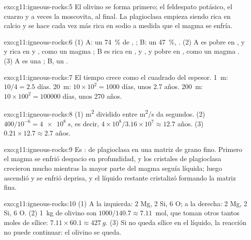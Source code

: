 \begin{solution}{exo:g11:igneous-rocks:5}
El olivino se forma primero; el feldespato potásico, el cuarzo y a veces la
moscovita, al final. La plagioclasa empieza siendo rica en calcio y se hace
cada vez más rica en sodio a medida que el magma se enfría.
\end{solution}

\begin{solution}{exo:g11:igneous-rocks:6}
(1) A: un \qty{74}{\percent} de , ; B: un \qty{47}{\percent},
. (2) A es pobre en ,  y  y rica en  y
, como un magma ; B es rica en ,  y , y
pobre en , como un magma . (3) A es una ; B, un .
\end{solution}

\begin{solution}{exo:g11:igneous-rocks:7}
El tiempo crece como el cuadrado del espesor. \qty{1}{m}: $10/4 = 2.5$
días. \qty{20}{m}: $10 \times 10^2 = 1000$ días, unos 2.7 años.
\qty{200}{m}: $10 \times 100^2 = \num{100000}$ días, unos 270 años.
\end{solution}

\begin{solution}{exo:g11:igneous-rocks:8}
(1) \unit{m^2} dividido entre \unit{m^2/s} da segundos. (2) $400/10^{-6} =
\qty{4e8}{s}$, es decir, $4 \times 10^8 / 3.16 \times 10^7 \approx 12.7$
años. (3) $0.21 \times 12.7 \approx 2.7$ años.
\end{solution}

\begin{solution}{exo:g11:igneous-rocks:9}
Es :  de plagioclasa en una matriz de grano fino.
Primero el magma se enfrió despacio en profundidad, y los cristales de
plagioclasa crecieron mucho mientras la mayor parte del magma seguía líquida;
luego ascendió y se enfrió deprisa, y el líquido restante cristalizó formando
la matriz fina.
\end{solution}

\begin{solution}{exo:g11:igneous-rocks:10}
(1) A la izquierda: 2 Mg, 2 Si, 6 O; a la derecha: 2 Mg, 2 Si, 6 O.
(2) \qty{1}{kg} de olivino son $1000/140.7 \approx 7.11$~mol, que toman otros
tantos moles de sílice: $7.11 \times 60.1 \approx \qty{427}{g}$. (3) Si no
queda sílice en el líquido, la reacción no puede continuar: el olivino se
queda.
\end{solution}

